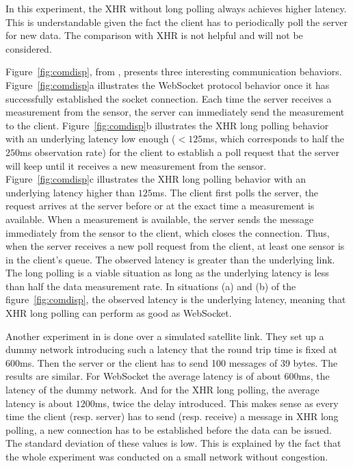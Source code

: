 \documentclass[10pt,journal,compsoc]{IEEEtran}
\newcommand{\ws}{WebSocket}
\begin{document}
In this experiment, the XHR without long polling always achieves higher latency.
This is understandable given the fact the client has to periodically poll the server for new data.
The comparison with XHR is not helpful and will not be considered.

Figure~\ref{fig:comdisp}, from \cite{communicationAndDIsplayingRealTimeDataWithWebSocket}, presents three interesting communication behaviors.
Figure~\ref{fig:comdisp}a illustrates the \ws{} protocol behavior once it has successfully established the socket connection. Each time the server receives a measurement from the sensor, the server can immediately send the measurement to the client.
Figure~\ref{fig:comdisp}b illustrates the XHR long polling behavior with an underlying latency low enough ($< 125 $ms, which corresponds to half the $250$ms observation rate) for the client to establish a poll request that the server will keep until it receives a new measurement from the sensor. %
Figure~\ref{fig:comdisp}c illustrates the XHR long polling behavior with an underlying latency higher than $125$ms.
The client first polls the server, the request arrives at the server before or at the exact time a measurement is available.
When a measurement is available, the server sends the message immediately from the sensor to the client, which closes the connection.%
Thus, when the server receives a new poll request from the client, at least one sensor is in the client's queue. 
The observed latency is greater than the underlying link.
The long polling is a viable situation as long as the underlying latency is less than half the data measurement rate.
In  situations (a) and (b) of the figure~\ref{fig:comdisp}, the observed latency is the underlying latency, meaning that XHR long polling can perform as good as \ws{}. 



Another experiment in \cite{collinalatency} is done over a simulated satellite link. They set up a dummy network introducing such a latency that the round trip time is fixed at $600$ms. 
Then the server or the client has to send 100 messages of 39 bytes. The results are similar. 
For \ws{} the average latency is of about $600$ms, the latency of the dummy network. And for the XHR long polling, the average latency is about $1200$ms, twice the delay introduced. 
This makes sense as every time the client (resp. server) has to send (resp. receive) a message in XHR long polling, a new connection has to be established before the data can be issued. 
The standard deviation of these values is low. 
This is explained by the fact that the whole experiment was conducted on a small network without congestion.
\end{document}
